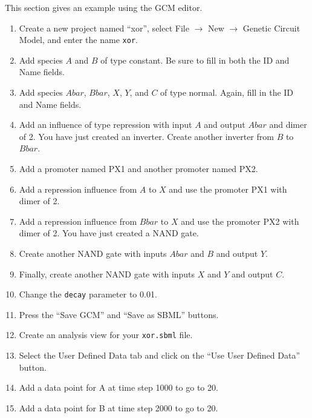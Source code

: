 \documentclass[titlepage,11pt]{article}
\begin{document}
This section gives an example using the GCM editor.
\begin{enumerate}
\item Create a new project named ``xor'',
      select File $\rightarrow$ New $\rightarrow$ Genetic Circuit Model, 
      and enter the name {\tt xor}.

\item Add species $A$ and $B$ of type constant.  Be sure to fill in both
      the ID and Name fields.

\item Add species $Abar$, $Bbar$, $X$, $Y$, and $C$ of type normal.  Again,
      fill in the ID and Name fields.

\item Add an influence of type repression with input $A$ and output $Abar$ and 
      dimer of 2.  You have just created an inverter.
      Create another inverter from $B$ to $Bbar$.

\item Add a promoter named PX1 and another promoter named PX2.

\item Add a repression influence from $A$ to $X$ and use the promoter 
      PX1 with dimer of 2.

\item Add a repression influence from $Bbar$ to $X$ and use the promoter 
      PX2 with dimer of 2.  You have just created a NAND gate.

\item Create another NAND gate with inputs $Abar$ and $B$ and output $Y$.

\item Finally, create another NAND gate with inputs $X$ and $Y$ and 
      output $C$.

\item Change the {\tt decay} parameter to 0.01.

\item Press the ``Save GCM'' and ``Save as SBML'' buttons.

\item Create an analysis view for your {\tt xor.sbml} file.

\item Select the User Defined Data tab and click on the 
      ``Use User Defined Data'' button.

\item Add a data point for A at time step 1000 to go to 20.

\item Add a data point for B at time step 2000 to go to 20.


\end{enumerate}
\end{document}

